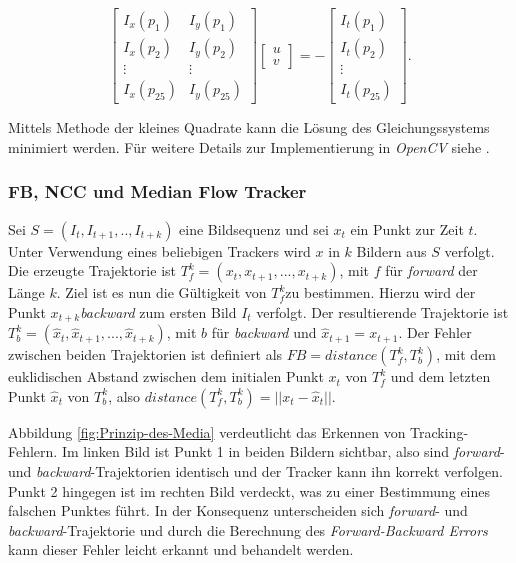 \begin{enumerate}
	\begin{equation}
	\left[\begin{array}{cc}
	I_{x}(p_{1}) & I_{y}(p_{1})\\
	I_{x}(p_{2}) & I_{y}(p_{2})\\
	\vdots & \vdots\\
	I_{x}(p_{25}) & I_{y}(p_{25})
	\end{array}\right]\left[\begin{array}{c}
	u\\
	v
	\end{array}\right]=-\left[\begin{array}{c}
	I_{t}(p_{1})\\
	I_{t}(p_{2})\\
	\vdots\\
	I_{t}(p_{25})
	\end{array}\right].
	\end{equation}
	\end{enumerate}
	Mittels Methode der kleines Quadrate kann die Lösung des Gleichungssystems minimiert werden. Für weitere Details zur Implementierung in \textit{OpenCV}
	siehe \cite{OCV}.

	\subsubsection{FB, NCC und Median Flow Tracker}
	Sei $S=(I_{t},I_{t+1},..,I_{t+k})$ eine Bildsequenz und sei $x_{t}$ ein Punkt zur Zeit $t$. Unter Verwendung eines beliebigen Trackers wird $x$ in $k$ Bildern aus $S$ verfolgt. Die erzeugte Trajektorie ist $T_{f}^{k}=(x_{t},x_{t+1},...,x_{t+k})$, mit $f$ für \textit{forward} der Länge $k$. Ziel ist es nun die Gültigkeit von $T_{f}^{k}$zu bestimmen. Hierzu wird der Punkt $x_{t+k}$\textit{backward} zum ersten Bild $I_{t}$ verfolgt. Der resultierende Trajektorie ist $T_{b}^{k}=(\hat{x}_{t},\hat{x}_{t+1},...,\hat{x}_{t+k})$, mit $b$ für \textit{backward} und $\hat{x}_{t+1}=x_{t+1}$. Der Fehler zwischen beiden Trajektorien ist definiert als $FB=distance(T_{f}^{k},T_{b}^{k})$, mit dem euklidischen Abstand zwischen dem initialen Punkt $x_{t}$ von $T_{f}^{k}$ und dem letzten Punkt $\hat{x}_{t}$ von $T_{b}^{k}$, also $distance(T_{f}^{k},T_{b}^{k})=||x_{t}-\hat{x}_{t}||$.

	Abbildung \ref{fig:Prinzip-des-Media} verdeutlicht das Erkennen von Tracking-Fehlern. Im linken Bild ist Punkt 1 in beiden Bildern sichtbar, also sind \textit{forward}- und \textit{backward}-Trajektorien identisch und der Tracker kann ihn korrekt verfolgen. Punkt 2 hingegen ist im rechten Bild verdeckt, was zu einer Bestimmung eines falschen Punktes führt. In der Konsequenz unterscheiden sich \textit{forward}- und \textit{backward}-Trajektorie und durch die Berechnung des \textit{Forward-Backward Errors} kann dieser Fehler leicht erkannt und behandelt werden.

